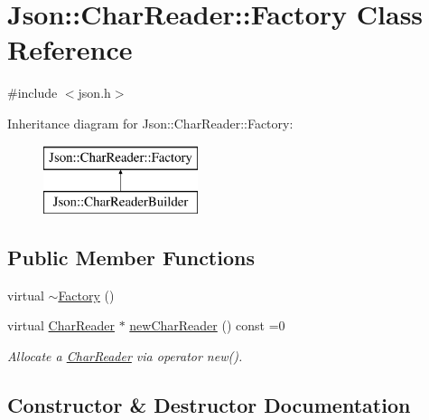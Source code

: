 \hypertarget{classJson_1_1CharReader_1_1Factory}{}\section{Json\+:\+:Char\+Reader\+:\+:Factory Class Reference}
\label{classJson_1_1CharReader_1_1Factory}


{\ttfamily \#include $<$json.\+h$>$}

Inheritance diagram for Json\+:\+:Char\+Reader\+:\+:Factory\+:\begin{figure}[H]
\begin{center}
\leavevmode
\includegraphics[height=2.000000cm]{classJson_1_1CharReader_1_1Factory}
\end{center}
\end{figure}
\subsection*{Public Member Functions}
\begin{DoxyCompactItemize}
\item 
virtual \hyperlink{classJson_1_1CharReader_1_1Factory_ae6938f632fa57f88e05818add5bc21be_ae6938f632fa57f88e05818add5bc21be}{$\sim$\+Factory} ()
\item 
virtual \hyperlink{classJson_1_1CharReader}{Char\+Reader} $\ast$ \hyperlink{classJson_1_1CharReader_1_1Factory_a4c5862a1ffd432372dbe65cf59de98c4_a4c5862a1ffd432372dbe65cf59de98c4}{new\+Char\+Reader} () const =0
\begin{DoxyCompactList}\small\item\em Allocate a \hyperlink{classJson_1_1CharReader}{Char\+Reader} via operator new(). \end{DoxyCompactList}\end{DoxyCompactItemize}


\subsection{Constructor \& Destructor Documentation}
\mbox{\label{classJson_1_1CharReader_1_1Factory_ae6938f632fa57f88e05818add5bc21be_ae6938f632fa57f88e05818add5bc21be}} 
